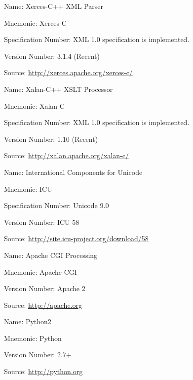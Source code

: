 \begin{description}
  \item {
    \begin{description}
      \item Name: Xerces-C++ XML Parser
      \item Mnemonic: Xerces-C
      \item Specification Number: XML 1.0 specification is implemented.
      \item Version Number: 3.1.4 (Recent)
      \item Source: \url{http://xerces.apache.org/xerces-c/}
    \end{description}
  }
  \item {
    \begin{description}
      \item Name: Xalan-C++ XSLT Processor 
      \item Mnemonic: Xalan-C
      \item Specification Number: XML 1.0 specification is implemented.
      \item Version Number: 1.10 (Recent)
      \item Source: \url{http://xalan.apache.org/xalan-c/}
    \end{description}
  }
  \item {
    \begin{description}
      \item Name: International Components for Unicode
      \item Mnemonic: ICU
      \item Specification Number: Unicode 9.0
      \item Version Number: ICU 58
      \item Source: \url{http://site.icu-project.org/download/58}
    \end{description}
  }
   \item {
     \begin{description}
       \item Name: Apache CGI Processing
       \item Mnemonic: Apache CGI
       \item Version Number: Apache 2
       \item Source: \url{http://apache.org}
     \end{description}
  }
  \item {
     \begin{description}
       \item Name: Python2
       \item Mnemonic: Python
       \item Version Number: 2.7+
       \item Source: \url{http://python.org}
     \end{description}
   }
\end{description}


